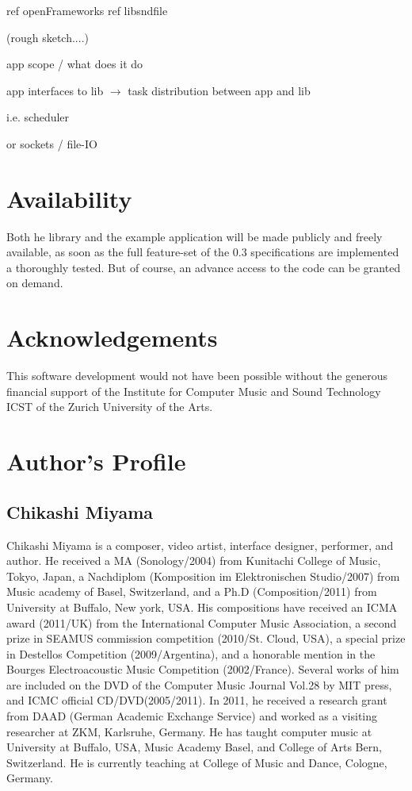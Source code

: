\documentclass[a4paper]{article}
\begin{document}
ref openFrameworks
ref libsndfile


(rough sketch....)

app scope / what does it do

app interfaces to lib $\rightarrow$ task distribution between app and lib

i.e. scheduler

or sockets / file-IO
\section{Availability}%

Both he library and the example application will be made publicly and freely available, as soon as the full feature-set of the 0.3 specifications are implemented a thoroughly tested.
But of course, an advance access to the code can be granted on demand.

\section{Acknowledgements}%

This software development would not have been possible without the generous financial support of the Institute for Computer Music and Sound Technology ICST of the Zurich University of the Arts.


\printbibliography


\section{Author's Profile}
\balance

\subsection*{Chikashi Miyama}
Chikashi Miyama is a composer, video artist, interface designer, performer, and author. He received a MA (Sonology/2004) from Kunitachi College of Music, Tokyo, Japan, a Nachdiplom (Komposition im Elektronischen Studio/2007) from Music academy of Basel, Switzerland, and a Ph.D (Composition/2011) from University at Buffalo, New york, USA. His compositions have received an ICMA award (2011/UK) from the International Computer Music Association, a second prize in SEAMUS commission competition (2010/St. Cloud, USA), a special prize in Destellos Competition (2009/Argentina), and a honorable mention in the Bourges Electroacoustic Music Competition (2002/France). Several works of him are included on the DVD of the Computer Music Journal Vol.28 by MIT press, and ICMC official CD/DVD(2005/2011). In 2011, he received a research grant from DAAD (German Academic Exchange Service) and worked as a visiting researcher at ZKM, Karlsruhe, Germany. He has taught computer music at  University at Buffalo, USA,  Music Academy Basel, and College of Arts Bern, Switzerland. He is currently teaching at College of Music and Dance, Cologne, Germany. 
\end{document}
